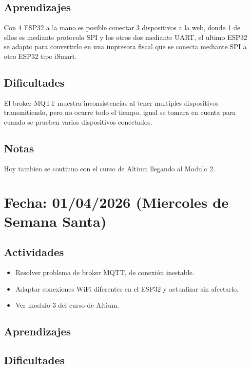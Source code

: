\documentclass[12pt, a4paper]{article}
\begin{document}
    \subsection*{Aprendizajes}

    Con 4 ESP32 a la mano es posible conectar 3 dispositivos a la web, donde 1 de ellos es mediante protocolo SPI y los otros dos mediante UART, el ultimo ESP32 se adapto para convertirlo en una impresora fiscal que se conecta mediante SPI a otro ESP32 tipo iSmart.

    \subsection*{Dificultades}

    El broker MQTT muestra inconsistencias al tener multiples dispositivos transmitiendo, pero no ocurre todo el tiempo, igual se tomara en cuenta para cuando se prueben varios dispositivos conectados.

    \subsection*{Notas}

    Hoy tambien se continuo con el curso de Altium llegando al Modulo 2.

    \section*{Fecha: 01/04/2026 (Miercoles de Semana Santa)}

    \subsection*{Actividades}

    \begin{itemize}
        \item Resolver problema de broker MQTT, de conexión inestable.
        \item Adaptar conexiones WiFi diferentes en el ESP32 y actualizar sin afectarlo.
        \item Ver modulo 3 del curso de Altium.
    \end{itemize}

    \subsection*{Aprendizajes}

    \subsection*{Dificultades}
\end{document}
